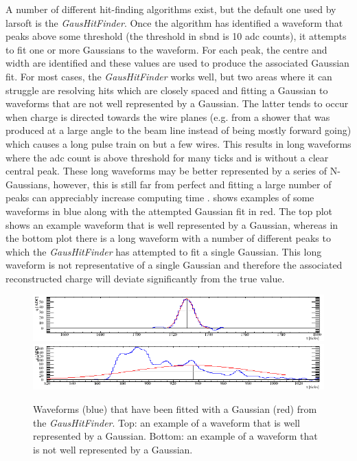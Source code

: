 A number of different hit-finding algorithms exist, but the default one used by \gls{larsoft} is the \textit{GausHitFinder}. Once the algorithm has identified a waveform that peaks above some threshold (the threshold in \gls{sbnd} is 10 \gls{adc} counts), it attempts to fit one or more Gaussians to the waveform. For each peak, the centre and width are identified and these values are used to produce the associated Gaussian fit. For most cases, the \textit{GausHitFinder} works well, but two areas where it can struggle are resolving hits which are closely spaced and fitting a Gaussian to waveforms that are not well represented by a Gaussian. The latter tends to occur when charge is directed towards the wire planes (e.g. from a shower that was produced at a large angle to the beam line instead of being mostly forward going) which causes a long pulse train on but a few wires. This results in long waveforms where the \gls{adc} count is above threshold for many ticks and is without a clear central peak. These long waveforms may be better represented by a series of N-Gaussians, however, this is still far from perfect and fitting a large number of peaks can appreciably increase computing time \cite{gaushitfinder}.  shows examples of some waveforms in blue along with the attempted Gaussian fit in red. The top plot shows an example waveform that is well represented by a Gaussian, whereas in the bottom plot there is a long waveform with a number of different peaks to which the \textit{GausHitFinder} has attempted to fit a single Gaussian. This long waveform is not representative of a single Gaussian and therefore the associated reconstructed charge will deviate significantly from the true value.

\begin{figure}[h!]
    \centering
    \includegraphics[width = \largefigwidth]{figures-chap4/good_gauss_fit.png}
    \includegraphics[width = \largefigwidth]{figures-chap4/bad_gauss_fit.png}
    \caption[Example of a well and poorly fitted waveform.]{Waveforms (blue) that have been fitted with a Gaussian (red) from the \textit{GausHitFinder}. Top: an example of a waveform that is well represented by a Gaussian. Bottom: an example of a waveform that is not well represented by a Gaussian.}
    \label{fig:fitted_waveforms}
\end{figure}

